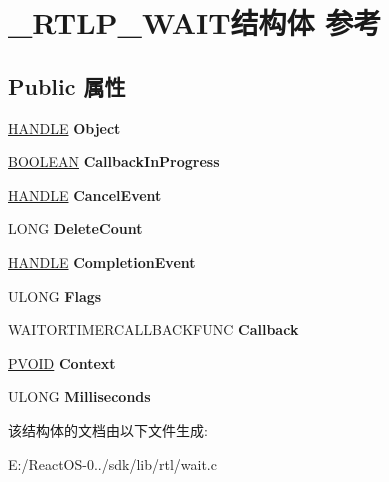 \hypertarget{struct___r_t_l_p___w_a_i_t}{}\section{\+\_\+\+R\+T\+L\+P\+\_\+\+W\+A\+I\+T结构体 参考}
\label{struct___r_t_l_p___w_a_i_t}
\subsection*{Public 属性}
\begin{DoxyCompactItemize}
\item 
\mbox{\label{struct___r_t_l_p___w_a_i_t_a8acd561bc69ed58358c2ac1fb5ed40c8}} 
\hyperlink{interfacevoid}{H\+A\+N\+D\+LE} {\bfseries Object}
\item 
\mbox{\label{struct___r_t_l_p___w_a_i_t_ae8b0df98cae3d064611e1a365576d832}} 
\hyperlink{_processor_bind_8h_a112e3146cb38b6ee95e64d85842e380a}{B\+O\+O\+L\+E\+AN} {\bfseries Callback\+In\+Progress}
\item 
\mbox{\label{struct___r_t_l_p___w_a_i_t_aaf6fa56ceebba20195c3e4c3cf62391b}} 
\hyperlink{interfacevoid}{H\+A\+N\+D\+LE} {\bfseries Cancel\+Event}
\item 
\mbox{\label{struct___r_t_l_p___w_a_i_t_a4ef909811414e778c84c2bef625d4b02}} 
L\+O\+NG {\bfseries Delete\+Count}
\item 
\mbox{\label{struct___r_t_l_p___w_a_i_t_af4fc40cc6abbe82882e3e652111a4d53}} 
\hyperlink{interfacevoid}{H\+A\+N\+D\+LE} {\bfseries Completion\+Event}
\item 
\mbox{\label{struct___r_t_l_p___w_a_i_t_a74e99398c546113977c4aff20fab63b1}} 
U\+L\+O\+NG {\bfseries Flags}
\item 
\mbox{\label{struct___r_t_l_p___w_a_i_t_ae0563cdc57227e6c4d1400bd6248547c}} 
W\+A\+I\+T\+O\+R\+T\+I\+M\+E\+R\+C\+A\+L\+L\+B\+A\+C\+K\+F\+U\+NC {\bfseries Callback}
\item 
\mbox{\label{struct___r_t_l_p___w_a_i_t_a4439cb6b5bbac225843b0223753aa281}} 
\hyperlink{interfacevoid}{P\+V\+O\+ID} {\bfseries Context}
\item 
\mbox{\label{struct___r_t_l_p___w_a_i_t_a758a0450b4d0dafc26b92f9794ed296a}} 
U\+L\+O\+NG {\bfseries Milliseconds}
\end{DoxyCompactItemize}


该结构体的文档由以下文件生成\+:\begin{DoxyCompactItemize}
\item 
E\+:/\+React\+O\+S-\/0../sdk/lib/rtl/wait.\+c\end{DoxyCompactItemize}
